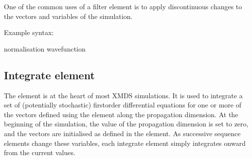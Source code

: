 \documentclass[letterpaper,10pt,english]{sphinxmanual}
\begin{document}
\sphinxAtStartPar
One of the common uses of a filter element is to apply discontinuous changes to the vectors and variables of the simulation.

\sphinxAtStartPar
Example syntax:

\begin{sphinxVerbatim}[commandchars=\\\{\}]
      \PYG{c+cp}{\PYGZlt{}![CDATA[}
      \PYG{c+cp}{]]\PYGZgt{}}

     
       normalisation wavefunction
       \PYG{c+cp}{\PYGZlt{}![CDATA[}
           
       \PYG{c+cp}{]]\PYGZgt{}}
\end{sphinxVerbatim}

\ignorespaces 

\subsection{Integrate element}
\label{\detokenize{reference_elements:integrate-element}}\label{\detokenize{reference_elements:integrateelement}}\label{\detokenize{reference_elements:index-67}}
\sphinxAtStartPar
The  element is at the heart of most XMDS simulations.  It is used to integrate a set of (potentially stochastic) first\sphinxhyphen{}order differential equations for one or more of the vectors defined using the  element along the propagation dimension.  At the beginning of the simulation, the value of the propagation dimension is set to zero, and the vectors are initialised as defined in the {\hyperref[\detokenize{reference_elements:vectorelement}]{}} element.  As successive sequence elements change these variables, each integrate element simply integrates onward from the current values.
\end{document}
